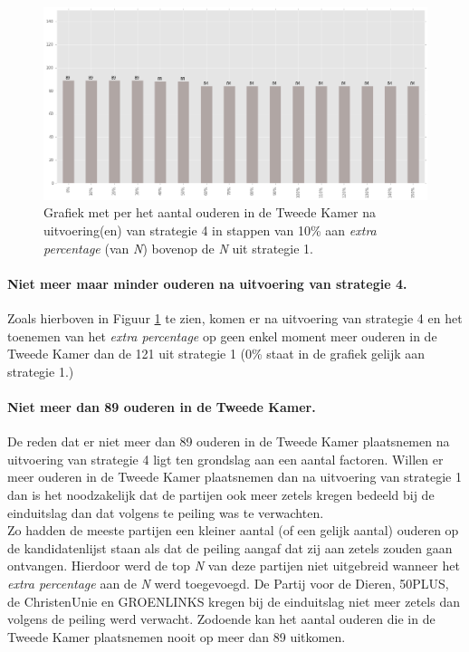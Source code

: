 \begin{figure}[H]

	\includegraphics[width=\linewidth]	{topNextrapercentage_aantal_ouderen_overzicht.png}

			\caption{Grafiek met per het aantal ouderen in de Tweede Kamer na uitvoering(en) van strategie 4 in stappen van 10\% aan \textit{extra percentage} (van \textit{N}) bovenop de \textit{N} uit strategie 1. }

\label{fig:bcS4O}
\end{figure}

\paragraph{Niet meer maar minder ouderen na uitvoering van strategie 4.}
Zoals hierboven in Figuur \ref{fig:bcS4O} te zien, komen er na uitvoering van strategie 4 en het toenemen van het \textit{extra percentage} op geen enkel moment meer ouderen in de Tweede Kamer dan de 121 uit strategie 1 (0\% staat in de grafiek gelijk aan strategie 1.) 


\paragraph{Niet meer dan 89 ouderen in de Tweede Kamer.}
De reden dat er niet meer dan 89 ouderen in de Tweede Kamer plaatsnemen na uitvoering van strategie 4 ligt ten grondslag aan een aantal factoren. Willen er meer ouderen in de Tweede Kamer plaatsnemen dan na uitvoering van strategie 1 dan is het noodzakelijk dat de partijen ook meer zetels kregen bedeeld bij de einduitslag dan dat volgens te peiling was te verwachten. 
\\
\indent
Zo hadden de meeste partijen een kleiner aantal (of een gelijk aantal) ouderen op de kandidatenlijst staan als dat de peiling aangaf dat zij aan zetels zouden gaan ontvangen. Hierdoor werd de top \textit{N} van deze partijen niet uitgebreid wanneer het \textit{extra percentage} aan de \textit{N} werd toegevoegd. De Partij voor de Dieren, 50PLUS, de ChristenUnie en GROENLINKS kregen bij de einduitslag niet meer zetels dan volgens de peiling werd verwacht. Zodoende kan het aantal ouderen die in de Tweede Kamer plaatsnemen nooit op meer dan 89 uitkomen.


